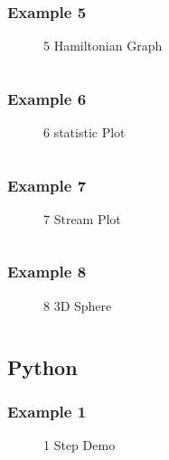 \documentclass[
  hyper,    
  lang=cn,
  class=book,
  bib_index={load},
  mathSpec={envStyle=leftbar, alias},
  toc={column=2, title=目录},
]{zlatex}
\begin{document}
\subsubsection{Example 5}
\begin{figure}[!htb]
    \centering
    
    \caption{5 Hamiltonian Graph}
    \label{fig:5-hamiltonian-graph}
\end{figure}
\inputminted{mathematica}{./example_5.wls}
\newpage


\subsubsection{Example 6}
\begin{figure}[!htb]
    \centering
    
    \caption{6 statistic Plot}
    \label{fig:6-statistic-plot}
\end{figure}
\inputminted{mathematica}{./example_6.wls}
\newpage



\subsubsection{Example 7}
\begin{figure}[!htb]
    \centering
    
    \caption{7 Stream Plot}
    \label{fig:7-stream-plot}
\end{figure}
\inputminted{mathematica}{./example_7.wls}
\newpage

\subsubsection{Example 8}
\begin{figure}[!htb]
    \centering
    
    \caption{8 3D Sphere}
    \label{fig:8-3d-sphere}
\end{figure}
\inputminted{mathematica}{./example_8.wls}
\newpage


\subsection{Python}
\subsubsection{Example 1}
\begin{figure}[!htb]
    \centering
    
    \caption{1 Step Demo}
    \label{fig:1-step-demo}
\end{figure}
\inputminted{python}{./example_1.mpl}
\newpage
\end{document}
